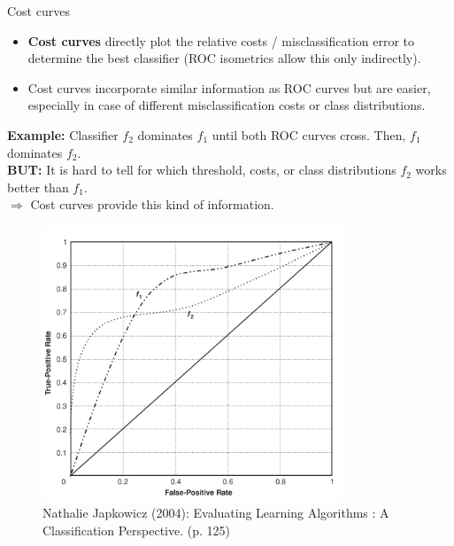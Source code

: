 \begin{vbframe}{Cost curves}

\begin{itemize}
  \item \textbf{Cost curves} directly plot the relative costs / 
  misclassification error to determine the best classifier (ROC isometrics allow 
  this only indirectly).
  \item Cost curves incorporate similar information as ROC curves but are 
  easier, especially in case of different misclassification costs or class 
  distributions. %
\end{itemize}

\vspace{-0.1cm}

\begin{minipage}{0.5\textwidth}
  \small
  \raggedright
  \textbf{Example:} Classifier $f_2$ dominates $f_1$ until both ROC curves 
  cross. Then, $f_1$ dominates $f_2$. \\
  \textbf{BUT:} It is hard to tell for which threshold, costs, or class 
  distributions $f_2$ works better than $f_1$. \\
  $\Rightarrow$ Cost curves provide this kind of information.
\end{minipage}
\begin{minipage}{0.49\textwidth}
  \begin{figure}
    \centering
    \includegraphics[width=0.8\textwidth]{figure_man/cost-curves-1.png}
    \tiny
    \\Nathalie Japkowicz (2004): Evaluating Learning Algorithms : A 
    Classification Perspective. (p. 125)
  \end{figure}
\end{minipage}


\end{vbframe}
